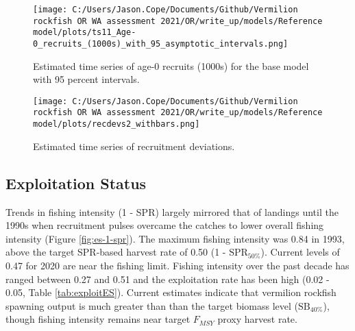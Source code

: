 \documentclass[11pt,
  english,
  a4paper,
]{article}
\begin{document}
\begin{figure}
\centering
\texttt{[image: C:/Users/Jason.Cope/Documents/Github/Vermilion rockfish OR WA assessment 2021/OR/write\_up/models/Reference model/plots/ts11\_Age-0\_recruits\_(1000s)\_with\_95\_asymptotic\_intervals.png]}
\caption{Estimated time series of age-0 recruits (1000s) for the base model with 95 percent intervals.\label{fig:es-recruits}}
\end{figure}

\tagmcend\tagstructend


\begin{figure}
\centering
\texttt{[image: C:/Users/Jason.Cope/Documents/Github/Vermilion rockfish OR WA assessment 2021/OR/write\_up/models/Reference model/plots/recdevs2\_withbars.png]}
\caption{Estimated time series of recruitment deviations.\label{fig:es-rec-devs}}
\end{figure}

\tagmcend\tagstructend

\clearpage


\hypertarget{exploitation-status}{%
\subsection*{Exploitation Status}\label{exploitation-status}}

\leavevmode\tagmcend\tagstructend


Trends in fishing intensity (1 - SPR) largely mirrored that of landings until the 1990s when recruitment pulses overcame the catches to lower overall fishing intensity (Figure \ref{fig:es-1-spr}). The maximum fishing intensity was 0.84 in 1993, above the target SPR-based harvest rate of 0.50 (1 - {\(\text{SPR}_{50\%}\)\leavevmode\tagmcend\tagstructend}). Current levels of 0.47 for 2020 are near the fishing limit. Fishing intensity over the past decade has ranged between 0.27 and 0.51 and the exploitation rate has been high (0.02 - 0.05, Table \ref{tab:exploitES}). Current estimates indicate that vermilion rockfish spawning output is much greater than than the target biomass level ({\(\text{SB}_{40\%}\)\leavevmode\tagmcend\tagstructend}), though fishing intensity remains near target {\(F_{MSY}\)\leavevmode\tagmcend\tagstructend} proxy harvest rate.
\end{document}
